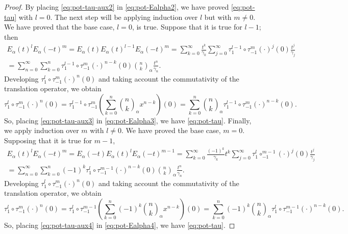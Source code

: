\documentclass[11pt,a4paper]{article}
\theoremstyle{plain}
\theoremstyle{remark}
\newcommand{\Ea}{E_{\alpha}}
\newcommand{\binoma}[2]{\binom{#1}{#2}_{\!\alpha}}
\begin{document}
\begin{proof}
By placing \eqref{eq:pot-tau-aux2} in \eqref{eq:pot-Ealpha2}, we have proved \eqref{eq:pot-tau} with $l=0$. The next step will be applying induction over $l$ but with $m\ne 0$. We have proved that the base case, $l=0$, is true. Suppose that it is true for $l-1$; then
\begin{multline}
\label{eq:pot-Ealpha3}
  \Ea(t)^l\Ea(-t)^m = \Ea(t)\Ea(t)^{l-1}\Ea(-t)^m
  = \sum_{k=0}^{\infty} \frac{t^k}{\gamma_k} 
  \sum_{j=0}^{\infty} \tau_1^{l-1}\circ\tau_{-1}^m(\cdot)^j(0) \frac{t^j}{\gamma_j} \\
  = \sum_{n=0}^{\infty} \sum_{k=0}^n \tau_1^{l-1}\circ\tau_{-1}^m(\cdot)^{n-k}(0)
  \binoma{n}{k}\frac{t^n}{\gamma_n}.
\end{multline}
Developing $\tau_1^l\circ\tau_{-1}^m(\cdot)^n(0)$ and taking account the commutativity of the translation operator, we obtain
\begin{equation}
\label{eq:pot-tau-aux3}
  \tau_1^l\circ\tau_{-1}^m(\cdot)^n(0)
  = \tau_1^{l-1}\circ\tau_{-1}^m \left(\sum_{k=0}^n \binoma{n}{k} x^{n-k}\right)(0)
  = \sum_{k=0}^n \binoma{n}{k} \tau^{l-1}_1\circ\tau_{-1}^{m}(\cdot)^{n-k}(0).
\end{equation}
So, placing \eqref{eq:pot-tau-aux3} in \eqref{eq:pot-Ealpha3}, we have \eqref{eq:pot-tau}. Finally, we apply induction over $m$ with $l\ne 0$. We have proved the base case, $m=0$. Supposing that it is true for $m-1$,
\begin{multline}
\label{eq:pot-Ealpha4}
  \Ea(t)^l\Ea(-t)^m = \Ea(-t)\Ea(t)^{l}\Ea(-t)^{m-1}
  = \sum_{k=0}^{\infty} \frac{(-1)^k}{\gamma_k} t^k 
  \sum_{j=0}^{\infty} \tau_1^{l}\circ_{-1}^{m-1}(\cdot)^j(0)\frac{t^j}{\gamma_j} \\
  = \sum_{n=0}^{\infty} \sum_{k=0}^n(-1)^k 
  \tau_1^{l} \circ\tau_{-1}^{m-1}(\cdot)^{n-k}(0) \binoma{n}{k} \frac{t^n}{\gamma_n}.
\end{multline}
Developing $\tau_1^l\circ\tau_{-1}^m(\cdot)^n(0)$ and taking account the commutativity of the translation operator, we obtain
\begin{equation}
\label{eq:pot-tau-aux4}
  \tau_1^l\circ\tau_{-1}^m(\cdot)^n(0)
  = \tau_1^{l}\circ\tau_{-1}^{m-1} \left(\sum_{k=0}^n(-1)^k \binoma{n}{k}x^{n-k}\right)(0)
  = \sum_{k=0}^n(-1)^k \binoma{n}{k} \tau^{l}_1\circ\tau_{-1}^{m-1}(\cdot)^{n-k}(0).
\end{equation}
So, placing \eqref{eq:pot-tau-aux4} in \eqref{eq:pot-Ealpha4}, we have \eqref{eq:pot-tau}.


\end{proof}
\end{document}
